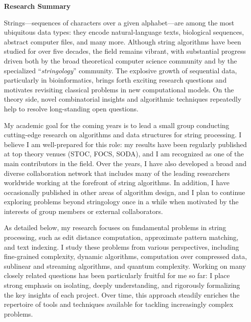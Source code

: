 \documentclass[a4paper,11pt]{article}
\begin{document}
\thispagestyle{firststyle}
\begin{center}
{\bfseries {Research Summary}}
\end{center}\vspace{-.25cm}

Strings---sequences of characters over a given alphabet---are among the most ubiquitous data types: they encode natural-language texts, biological sequences, abstract computer files, and many more. 
Although string algorithms have been studied for over five decades, the field remains vibrant, with substantial progress driven both by the broad theoretical computer science community and by the specialized ``\mbox{\emph{stringology}}'' community.
The explosive growth of sequential data, particularly in bioinformatics, brings forth exciting research questions and motivates revisiting classical problems in new computational models.
On the theory side, novel combinatorial insights and algorithmic techniques repeatedly help to resolve long-standing open questions.

My academic goal for the coming years is to lead a small group conducting cutting-edge research on algorithms and data structures for string processing.
I believe I am well-prepared for this role: my results have been regularly published at top theory venues (STOC, FOCS, SODA), and I am recognized as one of the main contributors in the field.
Over the years, I have also developed a broad and diverse collaboration network that includes many of the leading researchers worldwide working at the forefront of string algorithms.
In addition, I have occasionally published in other areas of algorithm design, and I plan to continue exploring problems beyond stringology once in a while when motivated by the interests of group members or external collaborators.

As detailed below, my research focuses on fundamental problems in string processing, such as edit distance computation, approximate pattern matching, and text indexing. 
I study these problems from various perspectives, including fine-grained complexity, dynamic algorithms, computation over compressed data, sublinear and streaming algorithms, and quantum complexity. 
Working on many closely related questions has been particularly fruitful for me so far: I place strong emphasis on isolating, deeply understanding, and rigorously formalizing the key insights of each project. 
Over time, this approach steadily enriches the repertoire of tools and techniques available for tackling increasingly complex problems.
\end{document}
